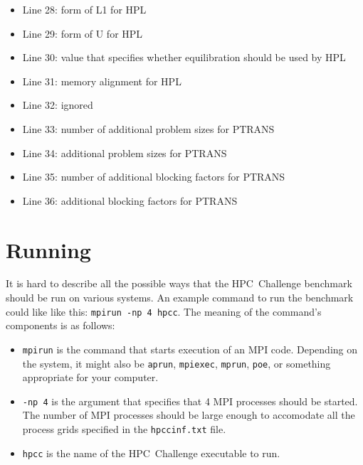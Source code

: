 \documentclass[twocolumn]{article}
\begin{document}
\begin{itemize}
\item Line 28: form of L1 for HPL
\item Line 29: form of U for HPL
\item Line 30: value that specifies whether equilibration should be used by HPL
\item Line 31: memory alignment for HPL
\item Line 32: ignored
\item Line 33: number of additional problem sizes for PTRANS
\item Line 34: additional problem sizes for PTRANS
\item Line 35: number of additional blocking factors for PTRANS
\item Line 36: additional blocking factors for PTRANS
\end{itemize}

\section{Running}
It is hard to describe all the possible ways that the HPC~Challenge
benchmark should be run on various systems.  An example command to run
the benchmark could like like this: \texttt{mpirun -np 4 hpcc}. The
meaning of the command's components is as follows:
\begin{itemize}
\item \texttt{mpirun} is the command that starts execution of an MPI
code. Depending on the system, it might also be \texttt{aprun},
\texttt{mpiexec}, \texttt{mprun}, \texttt{poe}, or something
appropriate for your computer.

\item \texttt{-np 4} is the argument that specifies that 4 MPI
processes should be started. The number of MPI processes should be
large enough to accomodate all the process grids specified in the
\texttt{hpccinf.txt} file.

\item \texttt{hpcc} is the name of the HPC~Challenge executable to
run.
\end{itemize}
\end{document}
